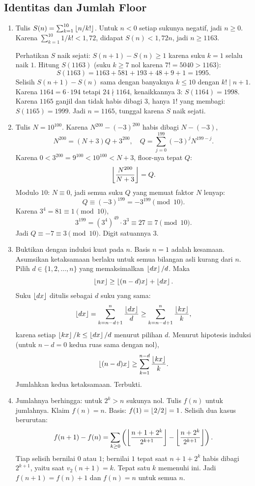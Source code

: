 \documentclass[12pt]{scrartcl}
\begin{document}
\subsection{Identitas dan Jumlah Floor}

\begin{enumerate}[resume]
	\item Tulis $S(n) = \sum_{k=1}^{10}\left\lfloor n/k! \right\rfloor$.
	Untuk $n < 0$ setiap sukunya negatif, jadi $n \ge 0$.
	Karena $\sum_{k=1}^{10} 1/k! < 1{,}72$,
	didapat $S(n) < 1{,}72n$, jadi $n \ge 1163$.

	Perhatikan $S$ naik sejati:
	$S(n+1) - S(n) \ge 1$ karena suku $k = 1$ selalu naik $1$.
	Hitung $S(1163)$ (suku $k \ge 7$ nol karena $7! = 5040 > 1163$):
	\[ S(1163) = 1163 + 581 + 193 + 48 + 9 + 1 = 1995. \]
	Selisih $S(n+1) - S(n)$ sama dengan banyaknya $k \le 10$
	dengan $k! \mid n+1$.
	Karena $1164 = 6 \cdot 194$ tetapi $24 \nmid 1164$,
	kenaikkannya $3$: $S(1164) = 1998$.
	Karena $1165$ ganjil dan tidak habis dibagi $3$,
	hanya $1!$ yang membagi: $S(1165) = 1999$.
	Jadi $n = 1165$, tunggal karena $S$ naik sejati.

	\item Tulis $N = 10^{100}$.
	Karena $N^{200} - (-3)^{200}$ habis dibagi $N - (-3)$,
	\[ N^{200} = (N+3)Q + 3^{200},
	\quad Q = \sum_{j=0}^{199}(-3)^j N^{199-j}. \]
	Karena $0 < 3^{200} = 9^{100} < 10^{100} < N + 3$,
	floor-nya tepat $Q$:
	\[ \left\lfloor \frac{N^{200}}{N+3} \right\rfloor = Q. \]
	Modulo $10$: $N \equiv 0$, jadi semua suku $Q$
	yang memuat faktor $N$ lenyap:
	\[ Q \equiv (-3)^{199} = -3^{199} \pmod{10}. \]
	Karena $3^4 = 81 \equiv 1 \pmod{10}$,
	\[ 3^{199} = (3^4)^{49} \cdot 3^3 \equiv 27 \equiv 7 \pmod{10}. \]
	Jadi $Q \equiv -7 \equiv 3 \pmod{10}$.
	Digit satuannya $3$.

	\item Buktikan dengan induksi kuat pada $n$.
	Basis $n = 1$ adalah kesamaan.
	Asumsikan ketaksamaan berlaku untuk semua bilangan asli kurang dari $n$.
	Pilih $d \in \{1, 2, \dots, n\}$ yang memaksimalkan $\left\lfloor dx \right\rfloor/d$.
	Maka
	\[ \left\lfloor nx \right\rfloor \ge \left\lfloor (n-d)x \right\rfloor + \left\lfloor dx \right\rfloor. \]
	Suku $\left\lfloor dx \right\rfloor$ ditulis sebagai $d$ suku yang sama:
	\[ \left\lfloor dx \right\rfloor = \sum_{k=n-d+1}^{n}\frac{\left\lfloor dx \right\rfloor}{d}
	\ge \sum_{k=n-d+1}^{n}\frac{\left\lfloor kx \right\rfloor}{k}, \]
	karena setiap $\left\lfloor kx \right\rfloor/k \le \left\lfloor dx \right\rfloor/d$ menurut pilihan $d$.
	Menurut hipotesis induksi
	(untuk $n - d = 0$ kedua ruas sama dengan nol),
	\[ \left\lfloor (n-d)x \right\rfloor \ge \sum_{k=1}^{n-d}\frac{\left\lfloor kx \right\rfloor}{k}. \]
	Jumlahkan kedua ketaksamaan. Terbukti.

	\item Jumlahnya berhingga:
	untuk $2^k > n$ sukunya nol.
	Tulis $f(n)$ untuk jumlahnya. Klaim $f(n) = n$.
	Basis: $f(1) = \left\lfloor 2/2 \right\rfloor = 1$.
	Selisih dua kasus berurutan:
	\[ f(n+1) - f(n)
	= \sum_{k \ge 0}\left(
	\left\lfloor \frac{n+1+2^k}{2^{k+1}} \right\rfloor - \left\lfloor \frac{n+2^k}{2^{k+1}} \right\rfloor
	\right). \]
	Tiap selisih bernilai $0$ atau $1$;
	bernilai $1$ tepat saat $n+1+2^k$ habis dibagi $2^{k+1}$,
	yaitu saat $v_2(n+1) = k$.
	Tepat satu $k$ memenuhi ini.
	Jadi $f(n+1) = f(n) + 1$ dan $f(n) = n$ untuk semua $n$.


\end{enumerate}
\end{document}
